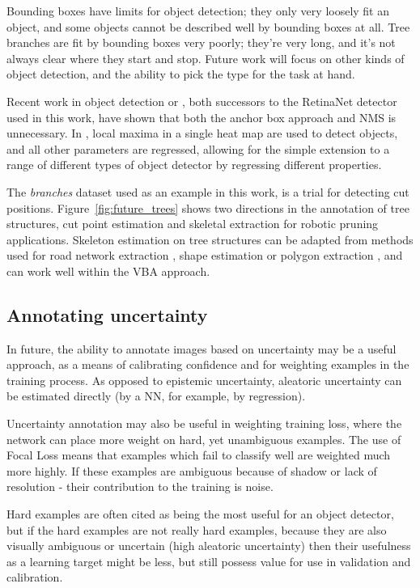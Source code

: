 Bounding boxes have limits for object detection; they only very loosely fit an object, and some objects cannot be described well by bounding boxes at all. Tree branches are fit by bounding boxes very poorly; they're very long, and it's not always clear where they start and stop. Future work will focus on other kinds of object detection, and the ability to pick the type for the task at hand.

Recent work in object detection \cite{Zhou2019} or \cite{Law2018}, both successors to the RetinaNet detector \cite{Wang2017} used in this work, have shown that both the anchor box approach and \gls{NMS} is unnecessary. In \cite{Zhou2019}, local maxima in a single heat map are used to detect objects, and all other parameters are regressed, allowing for the simple extension to a range of different types of object detector by regressing different properties.

The \emph{branches} dataset used as an example in this work, is a trial for detecting cut positions. Figure~\ref{fig:future_trees} shows two directions in the annotation of tree structures, cut point estimation and skeletal extraction for robotic pruning applications. Skeleton estimation on tree structures can be adapted from methods used for road network extraction \cite{Li2018}, shape estimation \cite{Jiang2019a} or polygon extraction \cite{Acuna2018}, and can work well within the \gls{VBA} approach.

\subsection{Annotating uncertainty}

In future, the ability to annotate images based on uncertainty may be a useful approach, as a means of calibrating confidence and for weighting examples in the training process. As opposed to epistemic uncertainty, aleatoric uncertainty can be estimated directly (by a \gls{NN}, for example, by regression).  

Uncertainty annotation may also be useful in weighting training loss, where the network can place more weight on hard, yet unambiguous examples. The use of Focal Loss means that examples which fail to classify well are weighted much more highly. If these examples are ambiguous because of shadow or lack of resolution - their contribution to the training is noise.

Hard examples are often cited as being the most useful for an object detector, but if the hard examples are not really hard examples, because they are also visually ambiguous or uncertain (high aleatoric uncertainty) then their usefulness as a learning target might be less, but still possess value for use in validation and calibration.



